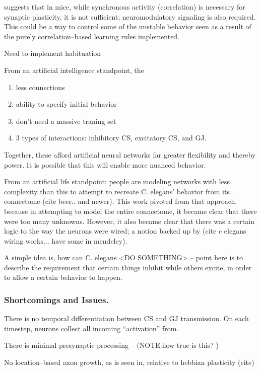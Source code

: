 \documentclass[letterpaper]{article}
\begin{document}
\cite{Johansens2014} suggests that in mice, while synchronous activity (correlation) is necessary for synaptic plasticity, it is not sufficient; neuromodulatory signaling is also required. This could be a way to control some of the unstable behavior seen as a result of the purely correlation--based learning rules implemented.


Need to implement habituation 

From an artificial intelligence standpoint, the

\begin{enumerate}
\item less connections
\item ability to specify initial behavior
\item don't need a massive traning set
\item 3 types of interactions: inhibitory CS, excitatory CS, and GJ.
\end{enumerate}

Together, these afford artificial neural networks far greater flexibility and thereby power. It is possible that this will enable more nuanced behavior.

From an artificial life standpoint: people are modeling networks with less complexity than this to attempt to recreate C. elegans' behavior from its connectome (cite beer.. and newer). This work pivoted from that approach, because in attempting to model the entire connectome, it became clear that there were too many unknowns. However, it also became clear that there was a certain logic to the way the neurons were wired; a notion backed up by (cite c elegans wiring works... have some in mendeley).

A simple idea is, how can C. elegans <DO SOMETHING> -- point here is to describe the requirement that certain things inhibit while others excite, in order to allow a certain behavior to happen.

\subsubsection{Shortcomings and Issues.}
There is no temporal differentiation between CS and GJ transmission. On each timestep, neurons collect all incoming ``activation'' from.

There is minimal presynaptic processing -- (NOTE:how true is this? )

No location--based axon growth, as is seen in, relative to hebbian plasticity (cite)
\end{document}
